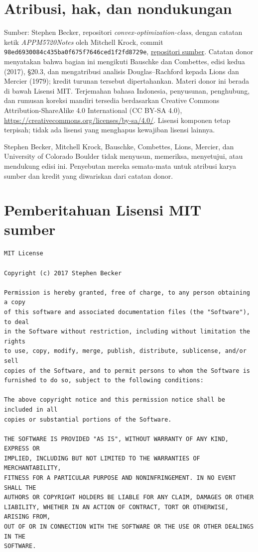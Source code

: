 \documentclass[indonesian]{shinybook}
\begin{document}
\chapter*{Atribusi, hak, dan nondukungan}
Sumber: Stephen Becker, repositori \emph{convex-optimization-class}, dengan
catatan ketik \emph{APPM5720Notes} oleh Mitchell Krock, commit
\texttt{98ed6930084c435ba0f675f7646ced1f2fd8729e},
\href{https://github.com/stephenbeckr/convex-optimization-class}{repositori sumber}.
Catatan donor menyatakan bahwa bagian ini mengikuti Bauschke dan Combettes,
edisi kedua (2017), \S20.3, dan mengatribusi analisis Douglas--Rachford kepada
Lions dan Mercier (1979); kredit turunan tersebut dipertahankan. Materi donor
ini berada di bawah Lisensi MIT. Terjemahan bahasa Indonesia, penyusunan,
penghubung, dan rumusan koreksi mandiri tersedia berdasarkan Creative Commons
Attribution-ShareAlike 4.0 International (CC BY-SA 4.0),
\url{https://creativecommons.org/licenses/by-sa/4.0/}. Lisensi komponen tetap
terpisah; tidak ada lisensi yang menghapus kewajiban lisensi lainnya.

Stephen Becker, Mitchell Krock, Bauschke, Combettes, Lions, Mercier, dan
University of Colorado Boulder tidak menyusun, memeriksa, menyetujui, atau
mendukung edisi ini. Penyebutan mereka semata-mata untuk atribusi karya sumber
dan kredit yang diwariskan dari catatan donor.

\chapter*{Pemberitahuan Lisensi MIT sumber}
\begin{verbatim}
MIT License

Copyright (c) 2017 Stephen Becker

Permission is hereby granted, free of charge, to any person obtaining a copy
of this software and associated documentation files (the "Software"), to deal
in the Software without restriction, including without limitation the rights
to use, copy, modify, merge, publish, distribute, sublicense, and/or sell
copies of the Software, and to permit persons to whom the Software is
furnished to do so, subject to the following conditions:

The above copyright notice and this permission notice shall be included in all
copies or substantial portions of the Software.

THE SOFTWARE IS PROVIDED "AS IS", WITHOUT WARRANTY OF ANY KIND, EXPRESS OR
IMPLIED, INCLUDING BUT NOT LIMITED TO THE WARRANTIES OF MERCHANTABILITY,
FITNESS FOR A PARTICULAR PURPOSE AND NONINFRINGEMENT. IN NO EVENT SHALL THE
AUTHORS OR COPYRIGHT HOLDERS BE LIABLE FOR ANY CLAIM, DAMAGES OR OTHER
LIABILITY, WHETHER IN AN ACTION OF CONTRACT, TORT OR OTHERWISE, ARISING FROM,
OUT OF OR IN CONNECTION WITH THE SOFTWARE OR THE USE OR OTHER DEALINGS IN THE
SOFTWARE.
\end{verbatim}
\end{document}

